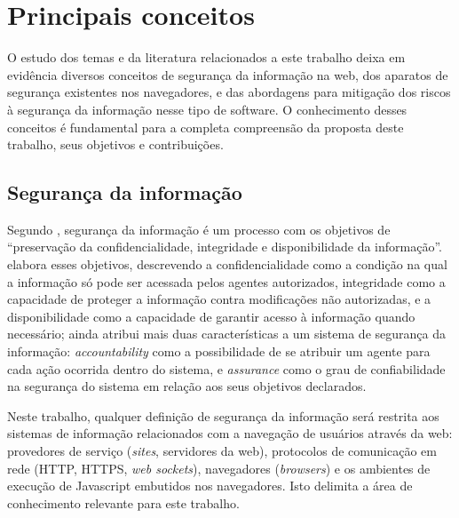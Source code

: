 \section{Principais conceitos}
O estudo dos temas e da literatura relacionados a este trabalho deixa em evidência diversos conceitos de segurança da informação na web, dos aparatos de segurança existentes nos navegadores, e das abordagens para mitigação dos riscos à segurança da informação nesse tipo de software. O conhecimento desses conceitos é fundamental para a completa compreensão da proposta deste trabalho, seus objetivos e contribuições.






\subsection{Segurança da informação}
Segundo \cite{ISO2016}, segurança da informação é um processo com os objetivos de ``preservação da confidencialidade, integridade e disponibilidade da informação''. \cite{Foster1998} elabora esses objetivos, descrevendo a confidencialidade como a condição na qual a informação só pode ser acessada pelos agentes autorizados, integridade como a capacidade de proteger a informação contra modificações não autorizadas, e a disponibilidade como a capacidade de garantir acesso à informação quando necessário; \cite{Foster1998} ainda atribui mais duas características a um sistema de segurança da informação: \textit{accountability} como a possibilidade de se atribuir um agente para cada ação ocorrida dentro do sistema, e \textit{assurance} como o grau de confiabilidade na segurança do sistema em relação aos seus objetivos declarados.

Neste trabalho, qualquer definição de segurança da informação será restrita aos sistemas de informação relacionados com a navegação de usuários através da web: provedores de serviço (\textit{sites}, servidores da web), protocolos de comunicação em rede (HTTP, HTTPS, \textit{web sockets}), navegadores (\textit{browsers}) e os ambientes de execução de Javascript embutidos nos navegadores. Isto delimita a área de conhecimento relevante para este trabalho.


